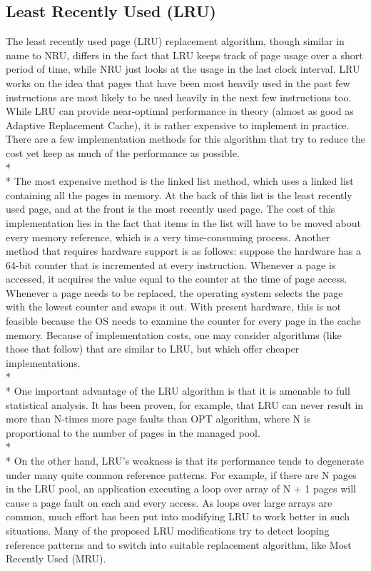 \documentclass[12pt, oneside, a4paper]{report}
\begin{document}
\subsection*{Least Recently Used (LRU)}
The least recently used page (LRU) replacement algorithm, though similar in name to NRU, differs in the fact that LRU keeps track of page usage over a short period of time, while NRU just looks at the usage in the last clock interval. LRU works on the idea that pages that have been most heavily used in the past few instructions are most likely to be used heavily in the next few instructions too. While LRU can provide near-optimal performance in theory (almost as good as Adaptive Replacement Cache), it is rather expensive to implement in practice. There are a few implementation methods for this algorithm that try to reduce the cost yet keep as much of the performance as possible.
\\*
\\*
The most expensive method is the linked list method, which uses a linked list containing all the pages in memory. At the back of this list is the least recently used page, and at the front is the most recently used page. The cost of this implementation lies in the fact that items in the list will have to be moved about every memory reference, which is a very time-consuming process.
Another method that requires hardware support is as follows: suppose the hardware has a 64-bit counter that is incremented at every instruction. Whenever a page is accessed, it acquires the value equal to the counter at the time of page access. Whenever a page needs to be replaced, the operating system selects the page with the lowest counter and swaps it out. With present hardware, this is not feasible because the OS needs to examine the counter for every page in the cache memory. Because of implementation costs, one may consider algorithms (like those that follow) that are similar to LRU, but which offer cheaper implementations.
\\*
\\*
One important advantage of the LRU algorithm is that it is amenable to full statistical analysis. It has been proven, for example, that LRU can never result in more than N-times more page faults than OPT algorithm, where N is proportional to the number of pages in the managed pool.
\\*
\\*
On the other hand, LRU's weakness is that its performance tends to degenerate under many quite common reference patterns. For example, if there are N pages in the LRU pool, an application executing a loop over array of N + 1 pages will cause a page fault on each and every access. As loops over large arrays are common, much effort has been put into modifying LRU to work better in such situations. Many of the proposed LRU modifications try to detect looping reference patterns and to switch into suitable replacement algorithm, like Most Recently Used (MRU).
\end{document}
